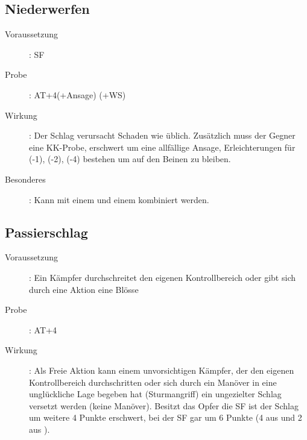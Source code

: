 \subsection{Niederwerfen }
\label{chap.bAT.niederwerfen}
\begin{description}
    \item[Voraussetzung]: SF 
    \item[Probe]: AT+4(+Ansage) (+WS)
    \item[Wirkung]: Der Schlag verursacht Schaden wie üblich.  Zusätzlich muss
        der Gegner eine KK-Probe, erschwert um eine allfällige Ansage,
        Erleichterungen für  (-1), 
        (-2),  (-4) bestehen um auf den
        Beinen zu bleiben.
    \item[Besonderes]: Kann mit einem  und einem
         kombiniert werden.
\end{description}

\subsection{Passierschlag }
\begin{description}
    \item[Voraussetzung]: Ein Kämpfer durchschreitet den eigenen
        Kontrollbereich oder gibt sich durch eine Aktion eine Blösse
    \item[Probe]: AT+4
    \item[Wirkung]: Als Freie Aktion kann einem unvorsichtigen Kämpfer, der den
        eigenen Kontrollbereich durchschritten oder sich durch ein Manöver in
        eine unglückliche Lage begeben hat (Sturmangriff) ein ungezielter
        Schlag versetzt werden (keine Manöver).  Besitzt das Opfer die SF
         ist der Schlag um weitere 4 Punkte
        erschwert, bei der SF  gar um 6 Punkte (4 aus
         und 2 aus ).
\end{description}

